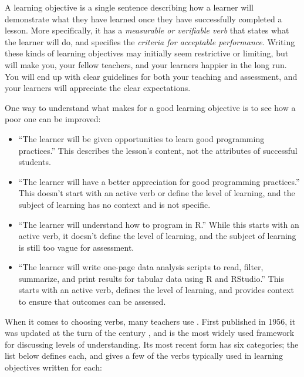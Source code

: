 A learning objective is a single sentence describing how a learner
will demonstrate what they have learned once they have successfully
completed a lesson. More specifically, it has a \emph{measurable or
verifiable verb} that states what the learner will do, and specifies
the \emph{criteria for acceptable performance}. Writing these kinds of
learning objectives may initially seem restrictive or limiting, but
will make you, your fellow teachers, and your learners happier in the
long run. You will end up with clear guidelines for both your teaching
and assessment, and your learners will appreciate the clear
expectations.

One way to understand what makes for a good learning objective is to
see how a poor one can be improved:

\begin{itemize}
\item
  ``The learner will be given opportunities to learn good programming
  practices.'' This describes the lesson's content, not the attributes
  of successful students.
\item
  ``The learner will have a better appreciation for good programming
  practices.'' This doesn't start with an active verb or define the
  level of learning, and the subject of learning has no context and is
  not specific.
\item
  ``The learner will understand how to program in R.'' While this starts
  with an active verb, it doesn't define the level of learning, and
  the subject of learning is still too vague for assessment.
\item
  ``The learner will write one-page data analysis scripts to read,
  filter, summarize, and print results for tabular data using R and
  RStudio.'' This starts with an active verb, defines the level of
  learning, and provides context to ensure that outcomes can be
  assessed.
\end{itemize}

When it comes to choosing verbs, many teachers use . First published in 1956, it
was updated at the turn of the century \cite{Ande2001}, and is the
most widely used framework for discussing levels of understanding. Its
most recent form has six categories; the list below defines each, and
gives a few of the verbs typically used in learning objectives written
for each:

